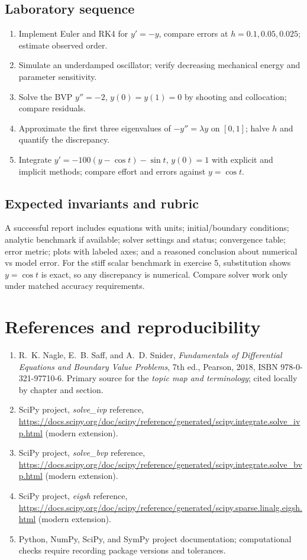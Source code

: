 \documentclass[11pt,letterpaper,oneside]{report}
\theoremstyle{definition}\newtheorem{definition}[theorem]{Definition}
\theoremstyle{remark}\newtheorem{remark}[theorem]{Remark}
\begin{document}
\section{Laboratory sequence}
\begin{enumerate}
\item Implement Euler and RK4 for $y'=-y$, compare errors at $h=0.1,0.05,0.025$; estimate observed order.
\item Simulate an underdamped oscillator; verify decreasing mechanical energy and parameter sensitivity.
\item Solve the BVP $y''=-2$, $y(0)=y(1)=0$ by shooting and collocation; compare residuals.
\item Approximate the first three eigenvalues of $-y''=\lambda y$ on $[0,1]$; halve $h$ and quantify the discrepancy.
\item Integrate $y'=-100(y-\cos t)-\sin t$, $y(0)=1$ with explicit and implicit methods; compare effort and errors against $y=\cos t$.
\end{enumerate}
\section{Expected invariants and rubric}
A successful report includes equations with units; initial/boundary conditions; analytic benchmark if available; solver settings and status; convergence table; error metric; plots with labeled axes; and a reasoned conclusion about numerical vs model error. For the stiff scalar benchmark in exercise 5, substitution shows $y=\cos t$ is exact, so any discrepancy is numerical. Compare solver work only under matched accuracy requirements.

\appendix
\chapter{References and reproducibility}
\begin{enumerate}
\item R.~K. Nagle, E.~B. Saff, and A.~D. Snider, \emph{Fundamentals of Differential Equations and Boundary Value Problems}, 7th ed., Pearson, 2018, ISBN 978-0-321-97710-6. Primary source for the \emph{topic map and terminology}; cited locally by chapter and section.
\item SciPy project, \emph{solve\_ivp} reference, \url{https://docs.scipy.org/doc/scipy/reference/generated/scipy.integrate.solve_ivp.html} (modern extension).
\item SciPy project, \emph{solve\_bvp} reference, \url{https://docs.scipy.org/doc/scipy/reference/generated/scipy.integrate.solve_bvp.html} (modern extension).
\item SciPy project, \emph{eigsh} reference, \url{https://docs.scipy.org/doc/scipy/reference/generated/scipy.sparse.linalg.eigsh.html} (modern extension).
\item Python, NumPy, SciPy, and SymPy project documentation; computational checks require recording package versions and tolerances.
\end{enumerate}
\end{document}
